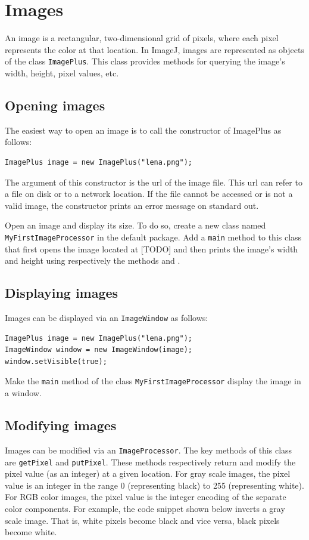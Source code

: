 \documentclass{book}
\begin{document}
\section{Images}
An image is a rectangular, two-dimensional grid of pixels, where each pixel represents the color at that location. In ImageJ, images are represented as objects of the class \texttt{ImagePlus}. This class provides methods for querying the image's width, height, pixel values, etc. 

\subsection{Opening images}
The easiest way to open an image is to call the constructor of ImagePlus as follows:
\begin{lstlisting}
ImagePlus image = new ImagePlus("lena.png");
\end{lstlisting}
The argument of this constructor is the url of the image file. This url can refer to a file on disk or to a network location. If the file cannot be accessed or is not a valid image, the constructor prints an error message on standard out.

\begin{exercise}
Open an image and display its size. To do so, create a new class named \texttt{MyFirstImageProcessor} in the default package. Add a \texttt{main} method to this class that first opens the image located at  [TODO] and then prints the image's width and height using respectively the methods  and .
\end{exercise}

\subsection{Displaying images}
Images can be displayed via an \texttt{ImageWindow} as follows:
\begin{lstlisting}
ImagePlus image = new ImagePlus("lena.png");
ImageWindow window = new ImageWindow(image);
window.setVisible(true);
\end{lstlisting}
\begin{exercise}
Make the \texttt{main} method of the class \texttt{MyFirstImageProcessor} display the image in a window.
\end{exercise}

\subsection{Modifying images}
Images can be modified via an \texttt{ImageProcessor}. The key methods of this class are \texttt{getPixel} and \texttt{putPixel}. These methods respectively return and modify the pixel value (as an integer) at a given location. For gray scale images, the pixel value is an integer in the range 0 (representing black) to 255 (representing white). For RGB color images, the pixel value is the integer encoding of the separate color components.  For example, the code snippet shown below inverts a gray scale image. That is, white pixels become black and vice versa, black pixels become white.
\end{document}
